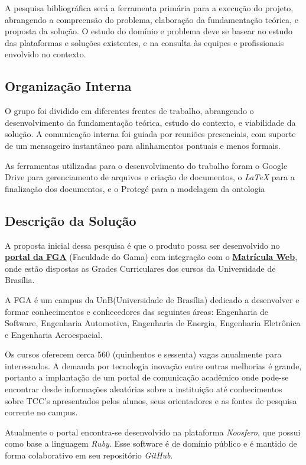 
A pesquisa bibliográfica será a ferramenta primária para a execução do projeto, abrangendo a compreensão do problema, elaboração da fundamentação teórica, e proposta da solução. O estudo do domínio e problema deve se basear no estudo das plataformas e soluções existentes, e na consulta às equipes e profissionais envolvido no contexto.

\subsection{Organização Interna}

O grupo foi dividido em diferentes frentes de trabalho, abrangendo o desenvolvimento da fundamentação teórica, estudo do contexto, e viabilidade da solução. A comunicação interna foi guiada por reuniões presenciais, com suporte de um mensageiro instantâneo para alinhamentos pontuais e menos formais.

As ferramentas utilizadas para o desenvolvimento do trabalho foram o Google Drive para gerenciamento de arquivos e criação de documentos, o \textit{LaTeX} para a finalização dos documentos, e o Protegé para a modelagem da ontologia


\subsection{Descrição da Solução} %
\label{sub:desc_da_solu_o}

	A proposta inicial dessa pesquisa é que o produto possa ser desenvolvido no \href{https://fga.unb.br/}{\textbf{portal da FGA}} (Faculdade do Gama) com integração com o \href{http://matriculaweb.unb.br}{\textbf{Matrícula Web}}, onde estão dispostas as Grades Curriculares dos cursos da Universidade de Brasília.

	A FGA é um campus da UnB(Universidade de Brasília) dedicado a desenvolver e formar conhecimentos e conhecedores das seguintes áreas: Engenharia de Software, Engenharia Automotiva, Engenharia de Energia, Engenharia Eletrônica e Engenharia Aeroespacial. 

	Os cursos oferecem cerca 560 (quinhentos e sessenta) vagas anualmente para interessados. A demanda por tecnologia inovação entre outras melhorias é grande, portanto a implantação de um portal de comunicação acadêmico onde pode-se encontrar desde informações aleatórias sobre a instituição até conhecimentos sobre TCC’s apresentados pelos alunos, seus orientadores e as fontes de pesquisa corrente no campus. 

	Atualmente o portal encontra-se desenvolvido na plataforma \textit{Noosfero}, que possui como base a linguagem \textit{Ruby}. Esse software é de domínio público e é mantido de forma colaborativo em seu repositório \textit{GitHub}.

